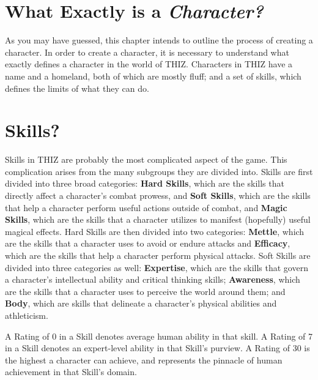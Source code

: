 \documentclass[oneside]{book}
\begin{document}
\section{What Exactly is a \emph{Character?}}
As you may have guessed, this chapter intends to outline the process of creating a character. In order to create a character, it is necessary to understand what exactly defines a character in the world of THIZ. Characters in THIZ have a name and a homeland, both of which are mostly fluff; and a set of skills, which defines the limits of what they can do.

\section{Skills?}
Skills in THIZ are probably the most complicated aspect of the game. This complication arises from the many subgroups they are divided into. Skills are first divided into three broad categories: \textbf{Hard Skills}, which are the skills that directly affect a character's combat prowess, and \textbf{Soft Skills}, which are the skills that help a character perform useful actions outside of combat, and \textbf{Magic Skills}, which are the skills that a character utilizes to manifest (hopefully) useful magical effects. Hard Skills are then divided into two categories: \textbf{Mettle}, which are the skills that a character uses to avoid or endure attacks and \textbf{Efficacy}, which are the skills that help a character perform physical attacks. Soft Skills are divided into three categories as well: \textbf{Expertise}, which are the skills that govern a character's intellectual ability and critical thinking skills; \textbf{Awareness}, which are the skills that a character uses to perceive the world around them; and \textbf{Body}, which are skills that delineate a character's physical abilities and athleticism.

A Rating of 0 in a Skill denotes average human ability in that skill. A Rating of 7 in a Skill denotes an expert-level ability in that Skill's purview. A Rating of 30 is the highest a character can achieve, and represents the pinnacle of human achievement in that Skill's domain.
\end{document}
